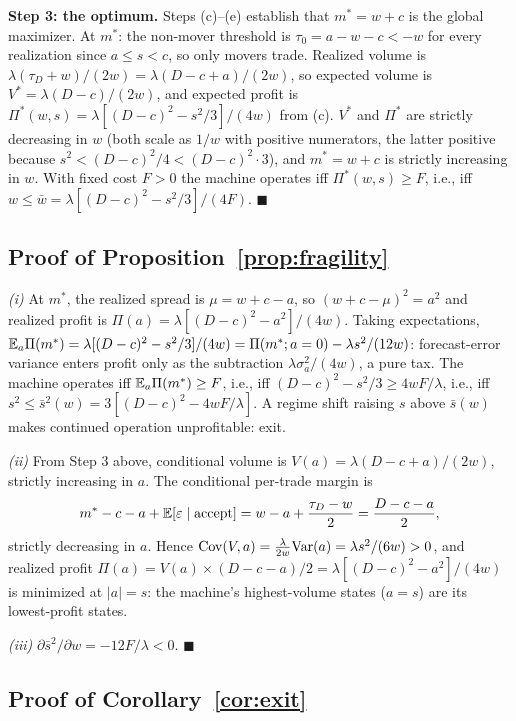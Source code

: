 \textbf{Step 3: the optimum.} Steps (c)--(e) establish that $m^* = w + c$ is the global maximizer. At $m^*$: the non-mover threshold is $\tau_0 = a - w - c < -w$ for every realization since $a \le s < c$, so only movers trade. Realized volume is $\lambda(\tau_D + w)/(2w) = \lambda(D - c + a)/(2w)$, so expected volume is $V^* = \lambda(D - c)/(2w)$, and expected profit is $\Pi^*(w, s) = \lambda[(D-c)^2 - s^2/3]/(4w)$ from (c). $V^*$ and $\Pi^*$ are strictly decreasing in $w$ (both scale as $1/w$ with positive numerators, the latter positive because $s^2 < (D-c)^2/4 < (D-c)^2 \cdot 3$), and $m^* = w + c$ is strictly increasing in $w$. With fixed cost $F > 0$ the machine operates iff $\Pi^*(w,s) \ge F$, i.e., iff $w \le \bar w = \lambda[(D-c)^2 - s^2/3]/(4F)$. $\blacksquare$

\subsection{Proof of Proposition~\ref{prop:fragility}}

\emph{(i)} At $m^*$, the realized spread is $\mu = w + c - a$, so $(w + c - \mu)^2 = a^2$ and realized profit is $\Pi(a) = \lambda[(D-c)^2 - a^2]/(4w)$. Taking expectations, $\mathbb{E}_a \Pi(m^*) = \lambda[(D-c)^2 - s^2/3]/(4w) = \Pi(m^*; a = 0) - \lambda s^2/(12 w)$: forecast-error variance enters profit only as the subtraction $\lambda \sigma_a^2 / (4w)$, a pure tax. The machine operates iff $\mathbb{E}_a \Pi(m^*) \ge F$, i.e., iff $(D-c)^2 - s^2/3 \ge 4wF/\lambda$, i.e., iff $s^2 \le \bar s^2(w) = 3[(D-c)^2 - 4wF/\lambda]$. A regime shift raising $s$ above $\bar s(w)$ makes continued operation unprofitable: exit.

\emph{(ii)} From Step 3 above, conditional volume is $V(a) = \lambda(D - c + a)/(2w)$, strictly increasing in $a$. The conditional per-trade margin is
\[
m^* - c - a + \mathbb{E}[\varepsilon \mid \text{accept}] = w - a + \frac{\tau_D - w}{2} = \frac{D - c - a}{2},
\]
strictly decreasing in $a$. Hence $\mathrm{Cov}(V, a) = \frac{\lambda}{2w} \mathrm{Var}(a) = \lambda s^2/(6w) > 0$, and realized profit $\Pi(a) = V(a) \times (D - c - a)/2 = \lambda[(D-c)^2 - a^2]/(4w)$ is minimized at $|a| = s$: the machine's highest-volume states ($a = s$) are its lowest-profit states.

\emph{(iii)} $\partial \bar s^2 / \partial w = -12 F / \lambda < 0$. $\blacksquare$

\subsection{Proof of Corollary~\ref{cor:exit}}

